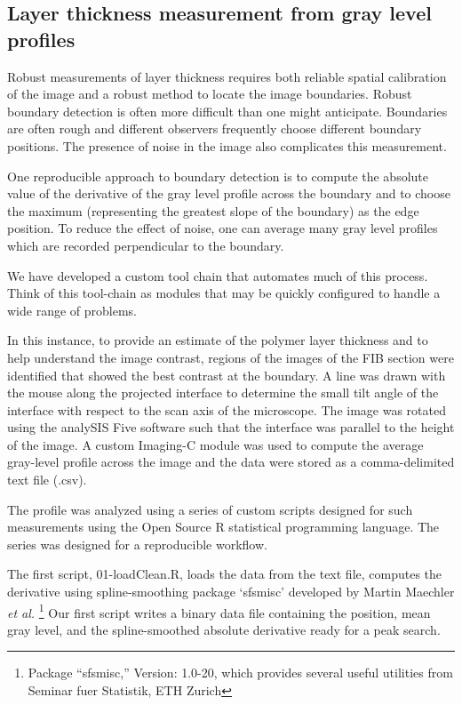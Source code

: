 \subsection{Layer thickness measurement from gray level profiles}

Robust measurements of layer thickness requires both reliable
spatial calibration of the image and a robust method to locate
the image boundaries. Robust boundary detection is often more
difficult than one might anticipate. Boundaries are often rough
and different observers frequently choose different boundary
positions. The presence of noise in the image also complicates
this measurement.

One reproducible approach to boundary detection is to compute
the absolute value of the derivative of the gray level profile
across the boundary and to choose the maximum (representing the
greatest slope of the boundary) as the edge position. To reduce
the effect of noise, one can average many gray level profiles
which are recorded perpendicular to the boundary.

We have developed a custom tool chain that automates much
of this process. Think of this tool-chain as modules that may
be quickly configured to handle a wide range of problems.

In this instance, to provide an estimate
of the polymer layer thickness and to help understand the
image contrast, regions of the images of the FIB section
were identified that showed the best contrast at the boundary.
A line was drawn with the mouse along the projected interface
to determine the small tilt angle of the interface with respect
to the scan axis of the microscope. The image was rotated using
the analySIS Five software such that the interface was parallel
to the height of the image. A custom Imaging-C module was used
to compute the average gray-level profile across the image
and the data were stored as a comma-delimited text file (.csv).

The profile was analyzed using a series of custom scripts designed
for such measurements using the Open Source R statistical programming
language. The series was designed for a reproducible workflow.

The first script, 01-loadClean.R, loads the data from the
text file, computes the derivative using spline-smoothing
package `sfsmisc' developed by Martin Maechler \emph{et al.}
\footnote{Package ``sfsmisc,'' Version: 1.0-20, which provides
several useful utilities from Seminar fuer Statistik, ETH Zurich}
Our first script writes a binary data file containing the
position, mean gray level, and the spline-smoothed absolute
derivative ready for a peak search.

